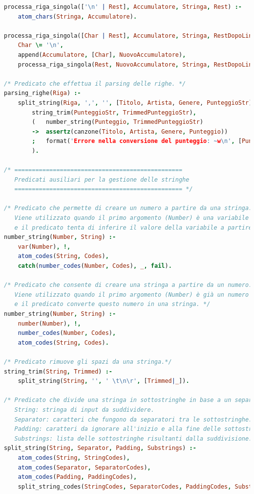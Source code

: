 \documentclass[a4paper,11pt]{article}
\begin{document}
\begin{lstlisting}[language=Prolog]
processa_riga_singola(['\n' | Rest], Accumulatore, Stringa, Rest) :-
    atom_chars(Stringa, Accumulatore).

processa_riga_singola([Char | Rest], Accumulatore, Stringa, RestDopoLinea) :-
    Char \= '\n',
    append(Accumulatore, [Char], NuovoAccumulatore),
    processa_riga_singola(Rest, NuovoAccumulatore, Stringa, RestDopoLinea).

/* Predicato che effettua il parsing delle righe. */
parsing_righe(Riga) :-
    split_string(Riga, ',', '', [Titolo, Artista, Genere, PunteggioStr]),
        string_trim(PunteggioStr, TrimmedPunteggioStr),
        (   number_string(Punteggio, TrimmedPunteggioStr)
        ->  assertz(canzone(Titolo, Artista, Genere, Punteggio))
        ;   format('Errore nella conversione del punteggio: ~w\n', [PunteggioStr])
        ).
    
/* ================================================
   Predicati ausiliari per la gestione delle stringhe
   ================================================ */

/* Predicato che permette di creare un numero a partire da una stringa.
   Viene utilizzato quando il primo argomento (Number) è una variabile
   e il predicato tenta di inferire il valore della variabile a partire dalla stringa. */
number_string(Number, String) :-
    var(Number), !,
    atom_codes(String, Codes),
    catch(number_codes(Number, Codes), _, fail).

/* Predicato che consente di creare una stringa a partire da un numero.
   Viene utilizzato quando il primo argomento (Number) è già un numero
   e il predicato converte questo numero in una stringa. */
number_string(Number, String) :-
    number(Number), !,
    number_codes(Number, Codes),
    atom_codes(String, Codes).

/* Predicato rimuove gli spazi da una stringa.*/
string_trim(String, Trimmed) :-
    split_string(String, '', ' \t\n\r', [Trimmed|_]).

/* Predicato che divide una stringa in sottostringhe in base a un separatore e a un padding.
   String: stringa di input da suddividere.
   Separator: caratteri che fungono da separatori tra le sottostringhe.
   Padding: caratteri da ignorare all'inizio e alla fine delle sottostringhe.
   Substrings: lista delle sottostringhe risultanti dalla suddivisione. */
split_string(String, Separator, Padding, Substrings) :-
    atom_codes(String, StringCodes),
    atom_codes(Separator, SeparatorCodes),
    atom_codes(Padding, PaddingCodes),
    split_string_codes(StringCodes, SeparatorCodes, PaddingCodes, Substrings).


\end{lstlisting}
\end{document}
